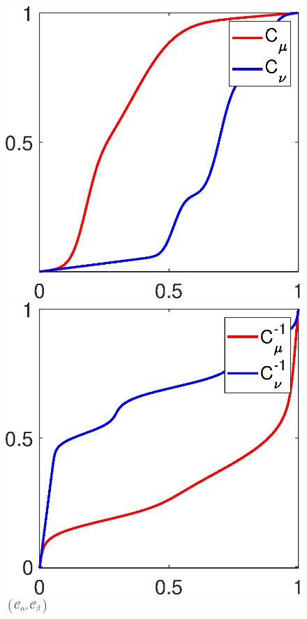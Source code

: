 \documentclass[cn,10pt,math=newtx,citestyle=gb7714-2015,bibstyle=gb7714-2015]{elegantbook}
\begin{document}
\begin{figure}[H]
	\begin{minipage}{0.24\linewidth}
		\centering
		\includegraphics[width=0.95\linewidth]{figure/fig2.11/cumul.eps}
		\caption*{$(\mathcal{C}_\alpha,\mathcal{C}_\beta)$}
	\end{minipage}
	\begin{minipage}{0.24\linewidth}
		\centering
		\includegraphics[width=0.95\linewidth]{figure/fig2.11/icumul.eps}

\end{minipage}
\end{figure}
\end{document}
